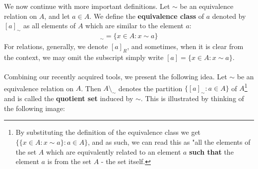 \documentclass{tufte-handout} %
\theoremstyle{definition}
\theoremstyle{remark}
\begin{document}
\\\\
We now continue with more important definitions. Let $\sim$ be an equivalence relation on $A$, and let $a
\in A$. We define the \textbf{equivalence class} of $a$ denoted by $[a]_{\sim}$ as all elements of $A$ which are similar to the element $a$:
\begin{align*}
    [a]_{\sim} = \{x\in A: x\sim a\}
\end{align*}
For relations, generally, we denote $[a]_{R}$, and sometimes, when it is clear from the context, we may omit the subscript simply write $[a] = \{x\in A: x\sim a\}$. \\\\
Combining our recently acquired tools, we present the following idea. Let $\sim$ be an equivalence relation on $A$. Then $A\setminus_{\sim}$ denotes the partition $\{[a]_{\sim}: a\in A\}$ of $A$\footnote{By substituting the definition of the equivalence class we get $\{\{x\in A: x\sim a\}: a\in A\}$, and as such, we can read this as "all the elements of the set $A$ which are equivalently related to an element $a$ \textbf{such that} the element $a$ is from the set $A$ - the set itself.} and is called the \textbf{quotient set} induced by $\sim$. This is illustrated by thinking of the following image: 
\begin{center}
\end{center}
\end{document}
